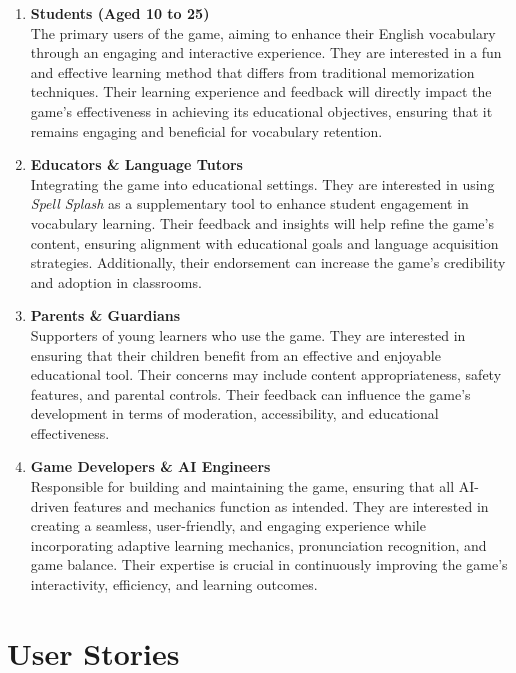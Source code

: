 \begin{enumerate}
    \item \textbf{Students (Aged 10 to 25)}\\
    The primary users of the game, aiming to enhance their English vocabulary through an engaging and interactive experience. 
    They are interested in a fun and effective learning method that differs from traditional memorization techniques. 
    Their learning experience and feedback will directly impact the game's effectiveness in achieving its educational objectives, ensuring that it remains engaging and beneficial for vocabulary retention.

    \item \textbf{Educators \& Language Tutors}\\
    Integrating the game into educational settings. 
    They are interested in using \textit{Spell Splash} as a supplementary tool to enhance student engagement in vocabulary learning. 
    Their feedback and insights will help refine the game’s content, ensuring alignment with educational goals and language acquisition strategies. 
    Additionally, their endorsement can increase the game's credibility and adoption in classrooms.

    \item \textbf{Parents \& Guardians}\\
    Supporters of young learners who use the game. 
    They are interested in ensuring that their children benefit from an effective and enjoyable educational tool. 
    Their concerns may include content appropriateness, safety features, and parental controls. 
    Their feedback can influence the game's development in terms of moderation, accessibility, and educational effectiveness.

    \item \textbf{Game Developers \& AI Engineers}\\
    Responsible for building and maintaining the game, ensuring that all AI-driven features and mechanics function as intended. 
    They are interested in creating a seamless, user-friendly, and engaging experience while incorporating adaptive learning mechanics, pronunciation recognition, and game balance. 
    Their expertise is crucial in continuously improving the game’s interactivity, efficiency, and learning outcomes.
\end{enumerate}

\section{User Stories}
\label{section:user-stories}

